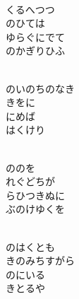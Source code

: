 \documentclass[10pt,b5j]{tarticle} %
\begin{document}
\begin{enumerate}
\begin{minipage}[c]{\blocksize}
        \vspace{\linespace}
        \item~\\
        くるへつつ\\
        のひては\\
        ゆらぐにでて\\
        のかぎりひふ
        
    \end{minipage}
    \begin{minipage}[c]{\blocksize}
        
        \vspace{\linespace}
        \item~\\
        のいのちのなき\\
        きをに\\
        にめば\\
        はくけり
        
    \end{minipage}
    \begin{minipage}[c]{\blocksize}
        
        \vspace{\linespace}
        \item~\\
        ののを\\
        れぐどちが\\
        らひつきぬに\\
        ぶのけゆくを
        
    \end{minipage}
    \begin{minipage}[c]{\blocksize}
        
        \vspace{\linespace}
        \item~\\
        のはくとも\\
        きのみちすがら\\
        のにいる\\
        きとるや
    
    \end{minipage}
\end{enumerate} %
\end{document}
